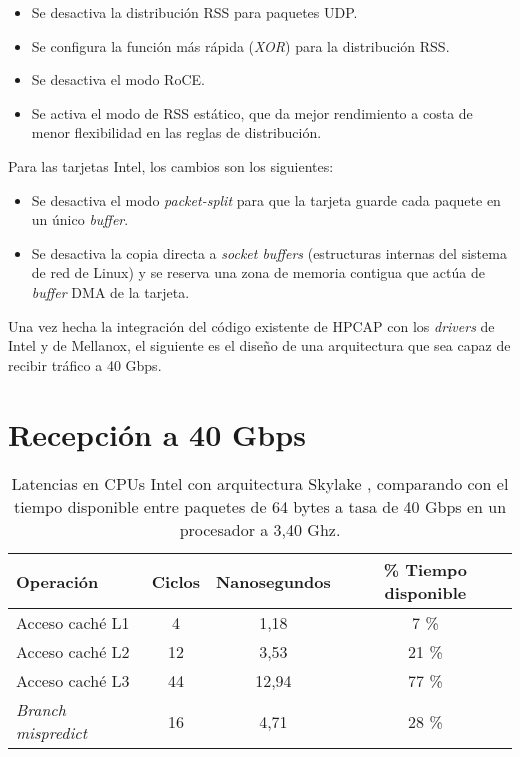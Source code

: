 \documentclass[twoside, 12pt]{epstfg}
\begin{document}
\begin{itemize}[itemsep = 0pt, topsep = 3pt]
\item Se desactiva la distribución \gls{RSS} para paquetes UDP.
\item Se configura la función más rápida (\textit{XOR}) para la distribución \gls{RSS}.
\item Se desactiva el modo \gls{RoCE}.
\item Se activa el modo de \gls{RSS} estático, que da mejor rendimiento a costa de menor flexibilidad en las reglas de distribución.
\end{itemize}

Para las tarjetas Intel, los cambios son los siguientes:

\begin{itemize}[itemsep = 0pt, topsep = 3pt]
\item Se desactiva el modo \textit{packet-split} para que la tarjeta guarde cada paquete en un único \textit{buffer}.
\item Se desactiva la copia directa a \textit{socket buffers} (estructuras internas del sistema de red de Linux) y se reserva una zona de memoria contigua que actúa de \textit{buffer} \gls{DMA} de la tarjeta.
\end{itemize}

Una vez hecha la integración del código existente de HPCAP con los \textit{drivers} de Intel y de Mellanox, el siguiente es el diseño de una arquitectura que sea capaz de recibir tráfico a 40 Gbps.

\section{Recepción a 40 Gbps}
\label{sec:Desarrollo:Recepcion40Gbps}

\begin{table}[hbtp]
\centering
\begin{tabular}{lccc}
\toprule
\textbf{Operación} & \textbf{Ciclos} & \textbf{Nanosegundos} & \textbf{\% Tiempo disponible} \\ \midrule
Acceso caché L1 & 4 	& 	1,18 & 	7 \% \\
Acceso caché L2 & 12 	& 	3,53 & 	21 \% \\
Acceso caché L3 & 44 	&  12,94 & 77 \% \\
\textit{Branch mispredict} & 16 & 4,71 & 28 \% \\ \bottomrule
\end{tabular}
\caption[Latencias en CPUs Intel con arquitectura Skylake]{Latencias en CPUs Intel con arquitectura Skylake \cite{intelOptimization}, comparando con el tiempo disponible entre paquetes de 64 bytes a tasa de 40 Gbps en un procesador a 3,40 Ghz.}
\label{tab:Desarrollo:LatenciaIntelSkylake}
\end{table}
\end{document}
